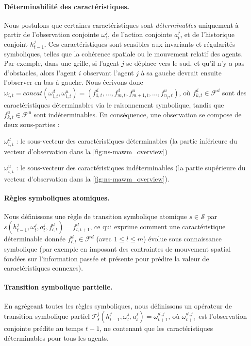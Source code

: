 \documentclass[final]{jfsma}
\theoremstyle{plain}
\theoremstyle{definition}
\theoremstyle{remark}
\begin{document}
\paragraph{Déterminabilité des caractéristiques.} Nous postulons que certaines caractéristiques sont \emph{déterminables} uniquement à partir de l'observation conjointe $\omega^j_t$, de l'action conjointe $a^j_t$, et de l'historique conjoint $h^j_{t-1}$. Ces caractéristiques sont sensibles aux invariants et régularités symboliques, telles que la cohérence spatiale ou le mouvement relatif des agents. Par exemple, dans une grille, si l'agent $j$ se déplace vers le sud, et qu'il n'y a pas d'obstacles, alors l'agent $i$ observant l'agent $j$ à sa gauche devrait ensuite l'observer en bas à gauche. Nous écrivons donc $\omega_{i,t} = concat(\omega^d_{i,t}, \omega^u_{i,t}) = \left(f^d_{1,t}, \ldots, f^d_{m,t}, f^u_{m+1,t}, \ldots, f^u_{n_f,t}\right)$, où $f^d_{k,t} \in \mathcal{F}^d$ sont des caractéristiques déterminables via le raisonnement symbolique, tandis que $f^u_{k,t} \in \mathcal{F}^u$ sont indéterminables. En conséquence, une observation se compose de deux sous-parties :
\begin{enumerate*}[label={\roman*) },itemjoin={; \quad}]
  \item $\omega^d_{i,t}$ : le sous-vecteur des caractéristiques déterminables (la partie inférieure du vecteur d'observation dans la \autoref{fig:ns-mawm_overview})
  \item $\omega^u_{i,t}$ : le sous-vecteur des caractéristiques indéterminables (la partie supérieure du vecteur d'observation dans la \autoref{fig:ns-mawm_overview}).
\end{enumerate*}

\paragraph{Règles symboliques atomiques.} Nous définissons une règle de transition symbolique atomique $s \in \mathcal{S}$ par $s(h^j_{t-1}, \omega^j_t, a^j_t, f^d_{l,t}) = f^d_{l,t+1}$, ce qui exprime comment une caractéristique déterminable donnée $f^d_{l,t} \in \mathcal{F}^d$ (avec $1 \leq l \leq m$) évolue sous connaissance symbolique (par exemple en imposant des contraintes de mouvement spatial fondées sur l'information passée et présente pour prédire la valeur de caractéristiques connexes).

\paragraph{Transition symbolique partielle.} En agrégeant toutes les règles symboliques, nous définissons un opérateur de transition symbolique partiel $\mathcal{T}^j_s(h^j_{t-1}, \omega^j_t, a^j_t) = \omega^{d,j}_{t+1}$, où $\omega^{d,j}_{t+1}$ est l'observation conjointe prédite au temps $t+1$, ne contenant que les caractéristiques déterminables pour tous les agents.
\end{document}
